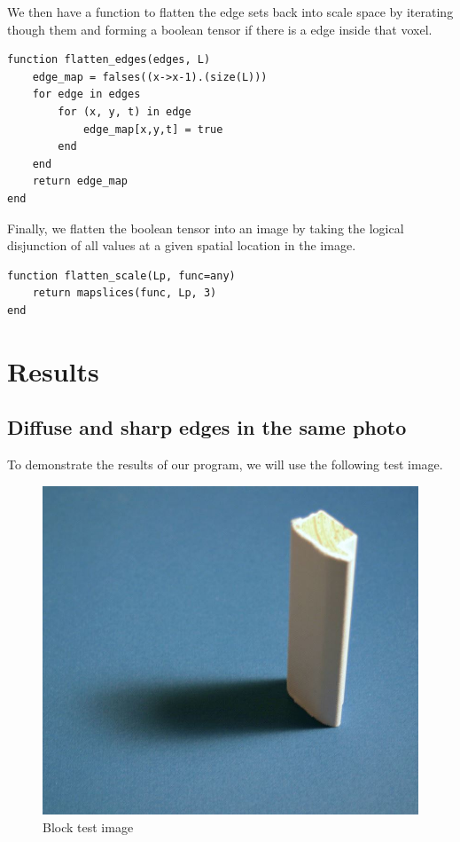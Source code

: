 \documentclass{article}
\begin{document}
We then have a function to flatten the edge sets back into scale space by iterating though them and forming a boolean tensor if there is a edge inside that voxel.
\begin{lstlisting}
function flatten_edges(edges, L)
    edge_map = falses((x->x-1).(size(L)))
    for edge in edges
        for (x, y, t) in edge
            edge_map[x,y,t] = true
        end
    end
    return edge_map
end
\end{lstlisting}

Finally, we flatten the boolean tensor into an image by taking the logical disjunction of all values at a given spatial location in the image.
\begin{lstlisting}
function flatten_scale(Lp, func=any)
    return mapslices(func, Lp, 3)
end
\end{lstlisting}

\section{Results}
\subsection{Diffuse and sharp edges in the same photo}
To demonstrate the results of our program, we will use the following test image.
\begin{figure}[H]
  \centering
  \includegraphics[scale=0.3]{Images/block/block_orig.jpg}
  \caption{Block test image}
  \label{block_orig}
\end{figure}
\end{document}
